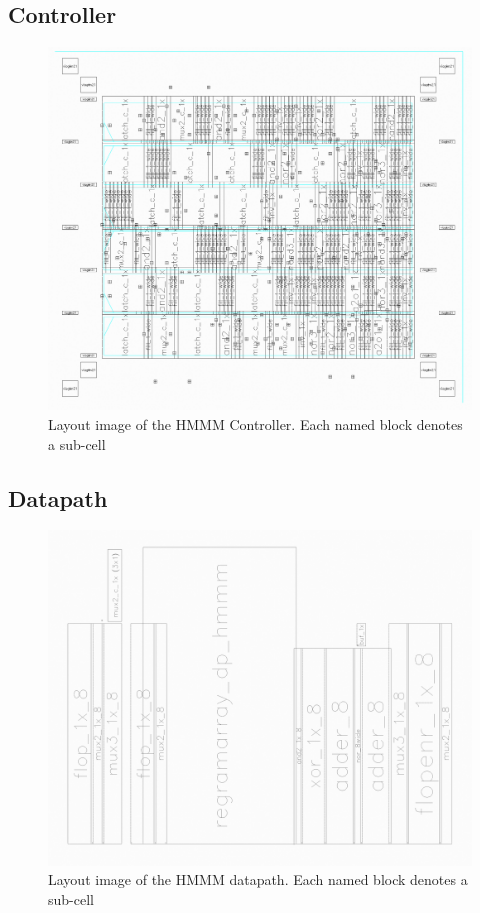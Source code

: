 \documentclass[12pt]{article}
\begin{document}
\begin{appendices}
    \subsection{Controller}
    \begin{figure}[H]
        \begin{center}
        \includegraphics[width=16cm]{HMMMController.png}
        \caption{Layout image of the HMMM Controller. Each named block denotes a sub-cell}
        \end{center}
    \end{figure}
    \subsection{Datapath}
    \begin{figure}[H]
        \begin{center}
        \includegraphics[width=16cm]{HMMMDatapath.png}
        \caption{Layout image of the HMMM datapath. Each named block denotes a sub-cell}
        \end{center}
        \label{fig:layoutimages}
    \end{figure}

\end{appendices}
\end{document}
